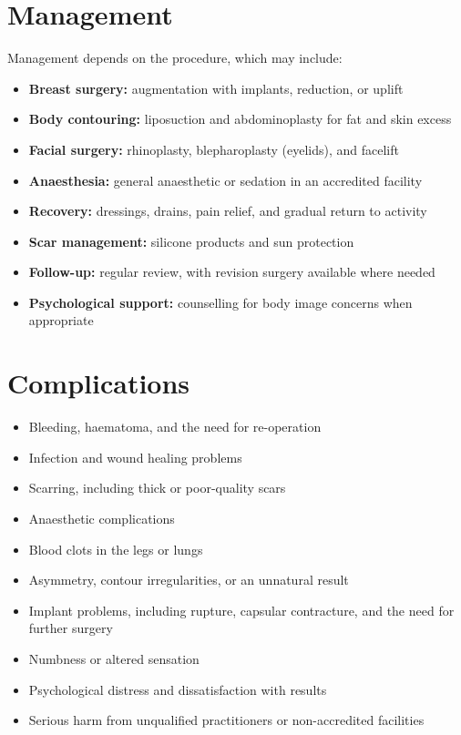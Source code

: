 \section*{Management}
Management depends on the procedure, which may include:

\begin{itemize}
    \item \textbf{Breast surgery:} augmentation with implants, reduction, or uplift
    \item \textbf{Body contouring:} liposuction and abdominoplasty for fat and skin excess
    \item \textbf{Facial surgery:} rhinoplasty, blepharoplasty (eyelids), and facelift
    \item \textbf{Anaesthesia:} general anaesthetic or sedation in an accredited facility
    \item \textbf{Recovery:} dressings, drains, pain relief, and gradual return to activity
    \item \textbf{Scar management:} silicone products and sun protection
    \item \textbf{Follow-up:} regular review, with revision surgery available where needed
    \item \textbf{Psychological support:} counselling for body image concerns when appropriate
\end{itemize}

\section*{Complications}
\begin{itemize}
    \item Bleeding, haematoma, and the need for re-operation
    \item Infection and wound healing problems
    \item Scarring, including thick or poor-quality scars
    \item Anaesthetic complications
    \item Blood clots in the legs or lungs
    \item Asymmetry, contour irregularities, or an unnatural result
    \item Implant problems, including rupture, capsular contracture, and the need for further surgery
    \item Numbness or altered sensation
    \item Psychological distress and dissatisfaction with results
    \item Serious harm from unqualified practitioners or non-accredited facilities
\end{itemize}

